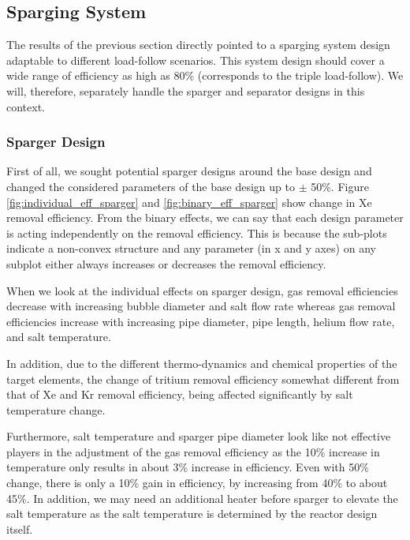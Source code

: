 \newpage
\FloatBarrier

\subsection{Sparging System}

    The results of the previous section directly pointed to a sparging system design adaptable to different load-follow scenarios. This system design should cover a wide range of efficiency as high as 80\% (corresponds to the triple load-follow). We will, therefore, separately handle the sparger and separator designs in this context.

\subsubsection{Sparger Design}

    First of all, we sought potential sparger designs around the base design and changed the considered parameters of the base design up to $\pm$ 50\%. Figure \ref{fig:individual_eff_sparger} and \ref{fig:binary_eff_sparger} show change in Xe removal efficiency. From the binary effects, we can say that each design parameter is acting independently on the removal efficiency. This is because the sub-plots indicate a non-convex structure and any parameter (in x and y axes) on any subplot either always increases or decreases the removal efficiency.

    When we look at the individual effects on sparger design, gas removal efficiencies decrease with increasing bubble diameter and salt flow rate whereas gas removal efficiencies increase with increasing pipe diameter, pipe length, helium flow rate, and salt temperature.

    In addition, due to the different thermo-dynamics and chemical properties of the target elements, the change of tritium removal efficiency somewhat different from that of Xe and Kr removal efficiency, being affected significantly by salt temperature change.

    Furthermore, salt temperature and sparger pipe diameter look like not effective players in the adjustment of the gas removal efficiency as the 10\% increase in temperature only results in about 3\% increase in efficiency. Even with 50\% change, there is only a 10\% gain in efficiency, by increasing from 40\% to about 45\%. In addition, we may need an additional heater before sparger to elevate the salt temperature as the salt temperature is determined by the reactor design itself.

